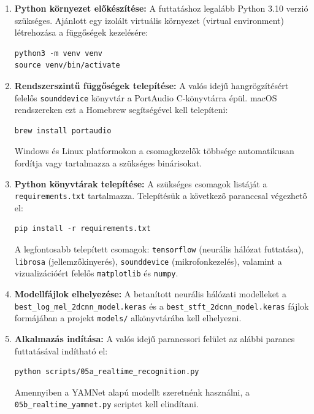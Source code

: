 \begin{enumerate}
    \item \textbf{Python környezet előkészítése:} A futtatáshoz legalább Python 3.10 verzió szükséges. Ajánlott egy izolált virtuális környezet (virtual environment) létrehozása a függőségek kezelésére:
\begin{verbatim}
python3 -m venv venv
source venv/bin/activate
\end{verbatim}

    \item \textbf{Rendszerszintű függőségek telepítése:} A valós idejű hangrögzítésért felelős \texttt{sounddevice} könyvtár a PortAudio C-könyvtárra épül. macOS rendszereken ezt a Homebrew segítségével kell telepíteni:
\begin{verbatim}
brew install portaudio
\end{verbatim}
    Windows és Linux platformokon a csomagkezelők többsége automatikusan fordítja vagy tartalmazza a szükséges binárisokat.

    \item \textbf{Python könyvtárak telepítése:} A szükséges csomagok listáját a \texttt{requirements.txt} tartalmazza. Telepítésük a következő paranccsal végezhető el:
\begin{verbatim}
pip install -r requirements.txt
\end{verbatim}
    A legfontosabb telepített csomagok: \texttt{tensorflow} (neurális hálózat futtatása), \texttt{librosa} (jellemzőkinyerés), \texttt{sounddevice} (mikrofonkezelés), valamint a vizualizációért felelős \texttt{matplotlib} és \texttt{numpy}.

    \item \textbf{Modellfájlok elhelyezése:} A betanított neurális hálózati modelleket a \texttt{best\_log\_mel\_}\allowbreak\texttt{2dcnn\_model.keras} és a \texttt{best\_stft\_}\allowbreak\texttt{2dcnn\_model.keras} fájlok formájában a projekt \texttt{models/} alkönyvtárába kell elhelyezni.

    \textbf{}
    \item \textbf{Alkalmazás indítása:} A valós idejű parancssori felület az alábbi parancs futtatásával indítható el:
\begin{verbatim}
python scripts/05a_realtime_recognition.py
\end{verbatim}
    Amennyiben a YAMNet alapú modellt szeretnénk használni, a \texttt{05b\_realtime\_yamnet.py} scriptet kell elindítani.
\end{enumerate}

